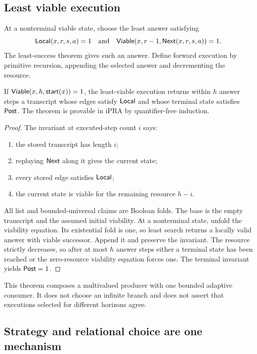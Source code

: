 \subsection{Least viable execution}

At a nonterminal viable state, choose the least answer satisfying
\[
 \mathsf{Local}(x,r,s,a)=1\quad\text{and}\quad
 \mathsf{Viable}(x,r-1,\mathsf{Next}(x,r,s,a))=1.
\]
The least-success theorem gives such an answer.  Define forward execution by primitive recursion, appending the selected answer and decrementing the resource.

\begin{theorem}\label{thm:rel-compose}
If \(\mathsf{Viable}(x,h,\mathsf{start}(x))=1\), the least-viable execution returns within \(h\) answer steps a transcript whose edges satisfy \(\mathsf{Local}\) and whose terminal state satisfies \(\mathsf{Post}\).  The theorem is provable in iPRA by quantifier-free induction.
\end{theorem}

\begin{proof}
The invariant at executed-step count \(i\) says:
\begin{enumerate}
\item the stored transcript has length \(i\);
\item replaying \(\mathsf{Next}\) along it gives the current state;
\item every stored edge satisfies \(\mathsf{Local}\);
\item the current state is viable for the remaining resource \(h-i\).
\end{enumerate}
All list and bounded-universal claims are Boolean folds.  The base is the empty transcript and the assumed initial viability.  At a nonterminal state, unfold the viability equation.  Its existential fold is one, so least search returns a locally valid answer with viable successor.  Append it and preserve the invariant.  The resource strictly decreases, so after at most \(h\) answer steps either a terminal state has been reached or the zero-resource viability equation forces one.  The terminal invariant yields \(\mathsf{Post}=1\).
\end{proof}

This theorem composes a multivalued producer with one bounded adaptive consumer.  It does not choose an infinite branch and does not assert that executions selected for different horizons agree.

\subsection{Strategy and relational choice are one mechanism}

